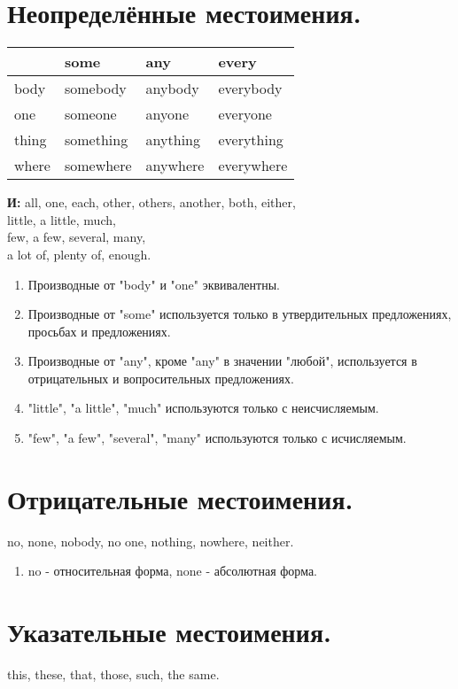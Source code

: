 \documentclass[oneside]{book}
\begin{document}
	\section{Неопределённые местоимения.}
	\begin{center}
		\begin{tabular}{|l|l|l|l|}
		\hline
			  & some      & any      & every      \\ \hline
		body  & somebody  & anybody  & everybody  \\ \hline
		one   & someone   & anyone   & everyone   \\ \hline
		thing & something & anything & everything \\ \hline
		where & somewhere & anywhere & everywhere \\ \hline
		\end{tabular}
	\end{center}

	\textbf{И:} all, one, each, other, others, another,
	both, either,
	\\
	little, a little, much,
	\\
	few, a few, several, many,
	\\
	a lot of, plenty of, enough.

	\begin{enumerate}
		\item Производные от "body" и "one" эквивалентны.
		
		\item Производные от "some" используется только в
		утвердительных предложениях, просьбах и предложениях.

		\item Производные от "any"{}, кроме "any" в значении
		"любой"{}, используется в отрицательных
		и вопросительных предложениях.

		\item "little"{}, "a little"{}, "much" используются только
		с неисчисляемым.

		\item "few"{}, "a few"{}, "several"{}, "many" используются
		только с исчисляемым.
	\end{enumerate}

	\section{Отрицательные местоимения.}
	no, none, nobody, no one, nothing, nowhere,
	neither.

	\begin{enumerate}
		\item no - относительная форма,
		none - абсолютная форма.
	\end{enumerate}

	\section{Указательные местоимения.}
	this, these, that, those, such, the same.
\end{document}
